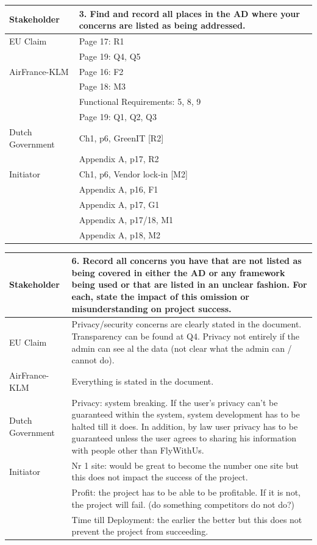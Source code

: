 \documentclass{article}
\begin{document}
\begin{tabularx}{\textwidth}{| l | X |}
  \hline
  \textbf{Stakeholder} & \textbf{3. Find and record all places in the AD where your concerns are listed as being addressed.} \\
  \hline
  EU Claim & Page 17: R1 \\
    & Page 19: Q4, Q5 \\
  \hline
  AirFrance-KLM & Page 16: F2 \\
    & Page 18: M3 \\
    & Functional Requirements: 5, 8, 9 \\
    & Page 19: Q1, Q2, Q3 \\
  \hline
  Dutch Government & Ch1, p6, GreenIT [R2] \\
    & Appendix A, p17, R2 \\
  \hline
  Initiator & Ch1, p6, Vendor lock-in [M2] \\
    & Appendix A, p16, F1 \\
    & Appendix A, p17, G1 \\
    & Appendix A, p17/18, M1 \\
    & Appendix A, p18, M2 \\
  \hline
\end{tabularx}

\begin{tabularx}{\textwidth}{| l | X |}
  \hline
  \textbf{Stakeholder} & \textbf{6. Record all concerns you have that are not listed as being covered in either the AD or any framework being used or that are listed in an unclear fashion. For each, state the impact of this omission or misunderstanding on project success.} \\
  \hline
  EU Claim & Privacy/security concerns are clearly stated in the document. Transparency can be found at Q4. Privacy not entirely if the admin can see al the data (not clear what the admin can / cannot do). \\
  \hline
  AirFrance-KLM & Everything is stated in the document. \\
  \hline
  Dutch Government & Privacy: system breaking. If the user's privacy can’t be guaranteed within the system, system development has to be halted till it does. In addition, by law user privacy has to be guaranteed unless the user agrees to sharing his information with people other than FlyWithUs. \\
  \hline
  Initiator & Nr 1 site: would be great to become the number one site but this does not impact the success of the project. \\
    & Profit: the project has to be able to be profitable. If it is not, the project will fail. (do something competitors do not do?) \\
    & Time till Deployment: the earlier the better but this does not prevent the project from succeeding. \\
  \hline
\end{tabularx}
\end{document}
